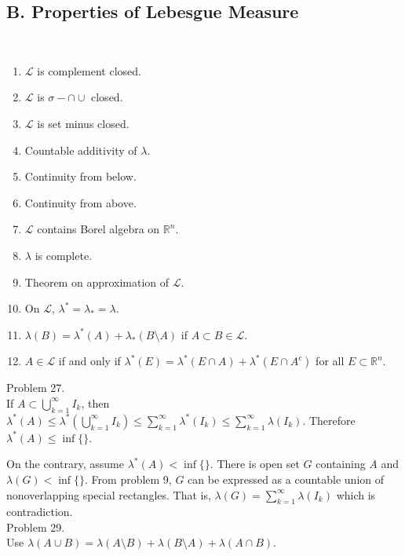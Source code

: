 \subsection*{B. Properties of Lebesgue Measure} \hfill \\

\begin{enumerate}
	\item $\mathcal{L}$ is complement closed.
	\item $\mathcal{L}$ is $\sigma - \cap \cup$ closed.
	\item $\mathcal{L}$ is set minus closed.
	\item Countable additivity of $\lambda$.
	\item Continuity from below.
	\item Continuity from above.
	\item $\mathcal{L}$ contains Borel algebra on $\mathbb{R}^n$.
	\item $\lambda$ is complete.
	\item Theorem on approximation of $\mathcal{L}$.
	\item On $\mathcal{L}$, $\lambda ^{*} = \lambda_{*} = \lambda$.
	\item $\lambda(B) = \lambda^{*}(A) + \lambda_{*}(B\setminus A)$ if $A \subset B \in \mathcal{L}$.
	\item $A\in \mathcal{L}$ if and only if $\lambda^{*}(E) = \lambda^{*}(E\cap A)+\lambda^{*}(E\cap A^{c})$ for all $E \subset \mathbb{R}^n$.
\end{enumerate}

Problem 27. \\

If $A \subset \bigcup_{k=1}^{\infty}I_{k}$, then $\lambda^{*}(A) \leq \lambda^{*}(\bigcup_{k=1}^{\infty}I_{k}) \leq \sum_{k=1}^{\infty}\lambda^{*}(I_{k}) \leq \sum_{k=1}^{\infty}\lambda(I_{k})$. Therefore $\lambda^{*}(A) \leq \inf{\{\} }$.

On the contrary, assume $\lambda^{*}(A) < \inf{ \{ \} }$. There is open set $G$ containing $A$ and $\lambda(G) < \inf{ \{ \} }$. From problem 9, $G$ can be expressed as a countable union of nonoverlapping special rectangles. That is, $\lambda(G) = \sum_{k=1}^{\infty}\lambda(I_{k})$ which is contradiction.\\

Problem 29. \\

Use $\lambda(A \cup B) = \lambda(A \setminus B) + \lambda(B \setminus A) + \lambda(A\cap B)$.\\


